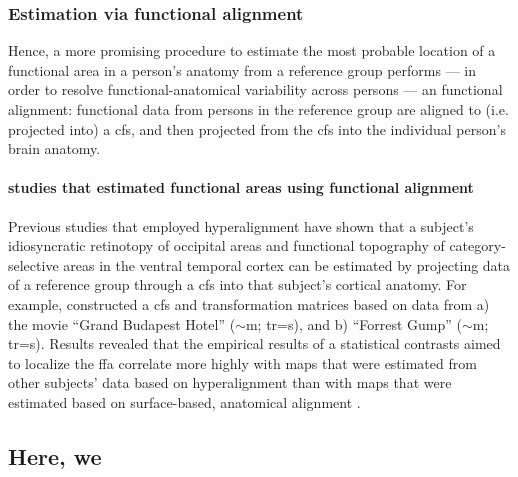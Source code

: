\subsubsection{Estimation via functional alignment}
%
Hence, a more promising procedure to estimate the most probable location of a
functional area in a person's anatomy from a reference group performs --- in
order to resolve functional-anatomical variability across persons --- an
functional alignment:
%
functional data from persons in the reference group are aligned to (i.e.
projected into) a \ac{cfs}, and then projected from the \ac{cfs} into the
individual person's brain anatomy.


\paragraph{studies that estimated functional areas using functional alignment}

Previous studies \citep{jiahui2020predicting, guntupalli2016model,
haxby2011common} that employed hyperalignment have shown that a subject's
idiosyncratic retinotopy of occipital areas and functional topography of
category-selective areas in the ventral temporal cortex can be estimated by
projecting data of a reference group through a \ac{cfs} into that subject's
cortical anatomy.
For example, \citep{jiahui2020predicting} constructed a \ac{cfs} and
transformation matrices based on data from a) the movie ``Grand Budapest Hotel''
($\sim$\unit[50]{m}; \ac{tr}=\unit[1]{s}), and b) ``Forrest Gump''
($\sim$\unit[120]{m}; \ac{tr}=\unit[2]{s}).
Results revealed that the empirical results of a statistical contrasts aimed to
localize the \ac{ffa} correlate more highly with maps that were estimated from
other subjects' data based on hyperalignment than with maps that were estimated
based on surface-based, anatomical alignment \citep{jiahui2020predicting}.


\subsection{Here, we}


